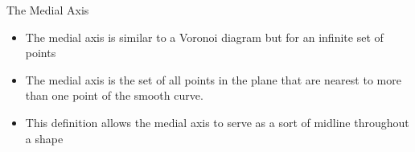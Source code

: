 \begin{frame}{The Medial Axis}
	\begin{itemize}
		\item The medial axis is similar to a Voronoi diagram but for an infinite set of points
		\item The medial axis is the set of all points in the plane that are nearest to more than one point of the smooth curve.
		\item This definition allows the medial axis to serve as a sort of midline throughout a shape
	\end{itemize}
	
\end{frame}

